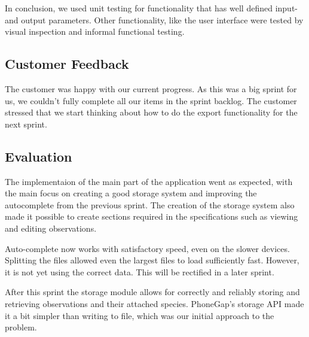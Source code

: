 In conclusion, we used unit testing for functionality that has well defined
input- and output parameters. Other functionality, like the user interface were
tested by visual inspection and informal functional testing.

\subsection{Customer Feedback}
The customer was happy with our current progress. As this was a big sprint for
us, we couldn't fully complete all our items in the sprint backlog. The customer
stressed that we start thinking about how to do the export functionality for the
next sprint.

\subsection{Evaluation}
The implementaion of the main part of the application went as expected, with the
main focus on creating a good storage system and improving the autocomplete from
the previous sprint. The creation of the storage system also made it possible to
create sections required in the specifications such as viewing and editing
observations.

Auto-complete now works with satisfactory speed, even on the slower devices. Splitting the files allowed even the largest files to load sufficiently fast. However, it is not yet using the correct data. This will be rectified in a later sprint.

After this sprint the storage module allows for correctly and reliably storing and retrieving observations and their attached species. PhoneGap's storage API made it a bit simpler than writing to file, which was our initial approach to the problem. 

